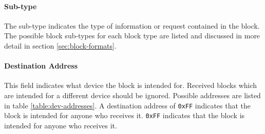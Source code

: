\paragraph{Sub-type}
The sub-type indicates the type of information or request contained in the block. The possible block sub-types
for each block type are listed and discussed in more detail in section \ref{sec:block-formats}.

\paragraph{Destination Address}
This field indicates what device the block is intended for. Received blocks which are intended for a different device
should be ignored. Possible addresses are listed in table \ref{table:dev-addresses}. A destination address of
\lstinline{0xFF} indicates that the block is intended for anyone who receives it. \lstinline{0xFF} indicates that the
block is intended for anyone who receives it.
